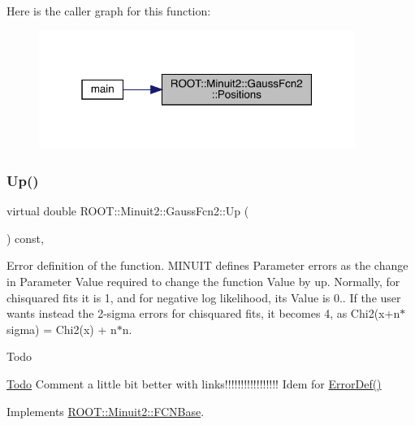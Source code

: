 Here is the caller graph for this function\+:
\nopagebreak
\begin{figure}[H]
\begin{center}
\leavevmode
\includegraphics[width=292pt]{da/d5d/classROOT_1_1Minuit2_1_1GaussFcn2_a11faaa08de303ea203403c320c9e1f0a_icgraph}
\end{center}
\end{figure}
\mbox{\label{classROOT_1_1Minuit2_1_1GaussFcn2_aef7172f9af50244bc9fce0c96cc21e81}} 
\subsubsection{\texorpdfstring{Up()}{Up()}\hspace{0.1cm}{\footnotesize\ttfamily [1/2]}}
{\footnotesize\ttfamily virtual double R\+O\+O\+T\+::\+Minuit2\+::\+Gauss\+Fcn2\+::\+Up (\begin{DoxyParamCaption}{ }\end{DoxyParamCaption}) const\hspace{0.3cm}{\ttfamily [inline]}, {\ttfamily [virtual]}}

Error definition of the function. M\+I\+N\+U\+IT defines Parameter errors as the change in Parameter Value required to change the function Value by up. Normally, for chisquared fits it is 1, and for negative log likelihood, its Value is 0.. If the user wants instead the 2-\/sigma errors for chisquared fits, it becomes 4, as Chi2(x+n$\ast$sigma) = Chi2(x) + n$\ast$n.

\begin{DoxyRefDesc}{Todo}
\item[\mbox{\hyperlink{todo__todo000001}{Todo}}]Comment a little bit better with links!!!!!!!!!!!!!!!!! Idem for \mbox{\hyperlink{classROOT_1_1Minuit2_1_1GaussFcn2_ac240f7b6ecbb7bf842d786e3914c620a}{Error\+Def()}}\end{DoxyRefDesc}


Implements \mbox{\hyperlink{classROOT_1_1Minuit2_1_1FCNBase_a04ef08ddad92ce8d89d498efbe021c39}{R\+O\+O\+T\+::\+Minuit2\+::\+F\+C\+N\+Base}}.


